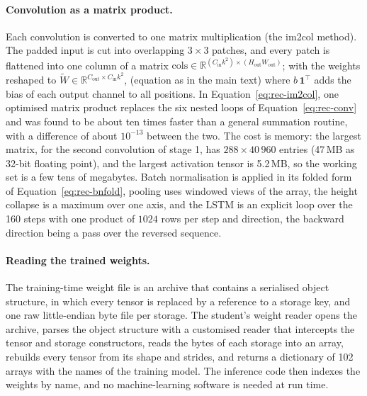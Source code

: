 \paragraph{Convolution as a matrix product.}
Each convolution is converted to one matrix multiplication (the im2col method).
The padded input is cut into overlapping $3\times3$ patches, and every patch is flattened into one column of a matrix $\mathrm{cols}\in\mathbb R^{(C_{\mathrm{in}}k^2)\times(H_{\mathrm{out}}W_{\mathrm{out}})}$; with the weights reshaped to $\tilde W\in\mathbb R^{C_{\mathrm{out}}\times C_{\mathrm{in}}k^2}$,
(equation as in the main text)
where $b\,\mathbf 1^\top$ adds the bias of each output channel to all positions.
In Equation~\ref{eq:rec-im2col}, one optimised matrix product replaces the six nested loops of Equation~\ref{eq:rec-conv} and was found to be about ten times faster than a general summation routine, with a difference of about $10^{-13}$ between the two.
The cost is memory: the largest matrix, for the second convolution of stage 1, has $288\times40\,960$ entries (47\,MB as 32-bit floating point), and the largest activation tensor is 5.2\,MB, so the working set is a few tens of megabytes.
Batch normalisation is applied in its folded form of Equation~\ref{eq:rec-bnfold}, pooling uses windowed views of the array, the height collapse is a maximum over one axis, and the LSTM is an explicit loop over the 160 steps with one product of $1024$ rows per step and direction, the backward direction being a pass over the reversed sequence.

\paragraph{Reading the trained weights.}
The training-time weight file is an archive that contains a serialised object structure, in which every tensor is replaced by a reference to a storage key, and one raw little-endian byte file per storage.
The student's weight reader opens the archive, parses the object structure with a customised reader that intercepts the tensor and storage constructors, reads the bytes of each storage into an array, rebuilds every tensor from its shape and strides, and returns a dictionary of 102 arrays with the names of the training model.
The inference code then indexes the weights by name, and no machine-learning software is needed at run time.

